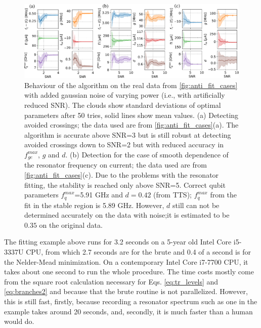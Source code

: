 \documentclass[%
 aip,
 draft,
 amsmath,amssymb,
 reprint,%
]{revtex4-1}
\begin{document}
\begin{figure}
	\centering
	\includegraphics[width=\linewidth]{noise_test}
	\caption{Behaviour of the algorithm on the real data from \autoref{fig:anti_fit_cases} with added gaussian noise of varying power (i.e., with artificially reduced SNR). The clouds show standard deviations of optimal parameters after 50 tries, solid lines show mean values. (a) Detecting avoided crossings; the data used are from \autoref{fig:anti_fit_cases}(a). The algorithm is accurate above SNR=3 but is	 still robust at detecting avoided crossings down to SNR=2 but with reduced accuracy in $f_{ge}^{max}$, $g$ and $d$. (b) Detection for the case of smooth dependence of the resonator frequency on current; the data used are from \autoref{fig:anti_fit_cases}(c). Due to the problems with the resonator fitting, the stability is reached only above SNR=5. Correct qubit parameters $f_{q}^{max}$=5.91 GHz and $d=0.42$ (from TTS); $f_{q}^{max}$ from the fit in the stable region is 5.89 GHz. However, $d$ still can not be determined accurately on the data with noise;it is estimated to be $0.35$ on the original data.}
	\label{fig:noise_test}
\end{figure}
The fitting example above runs for 3.2 seconds on a 5-year old Intel Core i5-3337U CPU, from which 2.7 seconds are for the brute and 0.4 of a second is for the Nelder-Mead minimization. On a contemporary Intel Core i7-7700 CPU, it takes about one second to run the whole procedure. The time costs mostly come from the square root calculation necessary for Eqs. \eqref{eq:tr_levels} and \eqref{eq:branches2} and because that the brute routine is not parallelized. However, this is still fast, firstly, because recording a resonator spectrum such as one in the example takes around 20 seconds, and, secondly, it is much faster than a human would do. 
\end{document}
